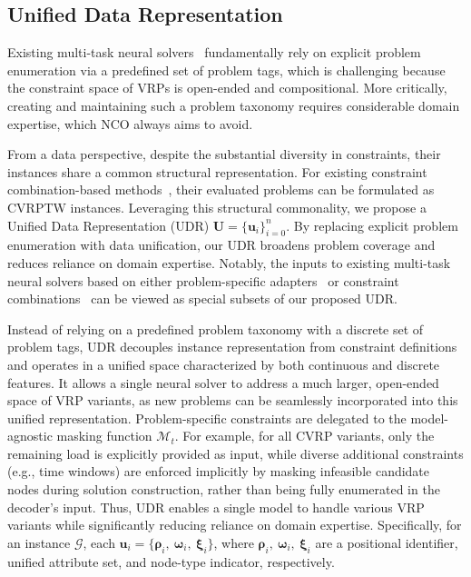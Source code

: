 \documentclass{article}
\theoremstyle{plain}
\theoremstyle{definition}
\theoremstyle{remark}
\begin{document}
\subsection{Unified Data Representation}
\label{sec:udr}

Existing multi-task neural solvers~\citep{zhou2024mvmoe,drakulic2025goal} fundamentally rely on explicit problem enumeration via a predefined set of problem tags, which is challenging because the constraint space of VRPs is open-ended and compositional. More critically, creating and maintaining such a problem taxonomy requires considerable domain expertise, which NCO always aims to avoid.

From a data perspective, despite the substantial diversity in constraints, their instances share a common structural representation. For existing constraint combination-based methods~\citep{liu2024mtpomo,zhou2024mvmoe}, their evaluated problems can be formulated as CVRPTW instances. Leveraging this structural commonality, we propose a Unified Data Representation (UDR) $\bm{U}=\{\mathbf{u}_{i}\}_{i=0}^{n}$. By replacing explicit problem enumeration with data unification, our UDR broadens problem coverage and reduces reliance on domain expertise. Notably, the inputs to existing multi-task neural solvers based on either problem-specific adapters~\citep{drakulic2025goal} or constraint combinations~\citep{zhou2024mvmoe} can be viewed as special subsets of our proposed UDR.

Instead of relying on a predefined problem taxonomy with a discrete set of problem tags, UDR decouples instance representation from constraint definitions and operates in a unified space characterized by both continuous and discrete features. It allows a single neural solver to address a much larger, open-ended space of VRP variants, as new problems can be seamlessly incorporated into this unified representation. Problem-specific constraints are delegated to the model-agnostic masking function $\mathcal{M}_t$. For example, for all CVRP variants, only the remaining load is explicitly provided as input, while diverse additional constraints (e.g., time windows) are enforced implicitly by masking infeasible candidate nodes during solution construction, rather than being fully enumerated in the decoder's input. Thus, UDR enables a single model to handle various VRP variants while significantly reducing reliance on domain expertise. Specifically, for an instance $\mathcal{G}$, each $\mathbf{u}_{i}=\{\bm{\rho}_{i},\ \bm{\omega}_{i},\ \bm{\xi}_{i}\}$, where $\bm{\rho}_{i},\ \bm{\omega}_{i},\ \bm{\xi}_{i}$ are a positional identifier, unified attribute set, and node-type indicator, respectively.
\end{document}
